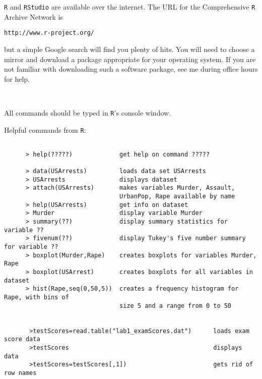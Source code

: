 \documentclass{report}
\begin{document}
 \newpage

{\tt R} and {\tt RStudio} are available over the internet.  The URL for the Comprehensive {\tt R}
Archive Network is

\centerline{\tt http://www.r-project.org/}

\noindent but a simple Google search will find you plenty of hits.
You will need to choose a mirror and download a
package appropriate for your operating system.  If you are not
familiar with downloading such a software package, see me during
office hours for help.

\

\noindent All commands should be typed in {\tt R}'s console window.

\smallskip

Helpful commands from {\tt R}:

\begin{verbatim}

      > help(?????)             get help on command ?????

      > data(USArrests)         loads data set USArrests
      > USArrests               displays dataset
      > attach(USArrests)       makes variables Murder, Assault,
                                UrbanPop, Rape available by name
      > help(USArrests)         get info on dataset
      > Murder                  display variable Murder
      > summary(??)             display summary statistics for variable ??
      > fivenum(??)             display Tukey's five number summary for variable ??
      > boxplot(Murder,Rape)    creates boxplots for variables Murder, Rape
      > boxplot(USArrest)       creates boxplots for all variables in dataset
      > hist(Rape,seq(0,50,5))  creates a frequency histogram for Rape, with bins of
                                size 5 and a range from 0 to 50
                                
                                
       >testScores=read.table("lab1_examScores.dat")      loads exam score data
       >testScores                                        displays data
       >testScores=testScores[,1])                        gets rid of row names
\end{verbatim}
\end{document}

